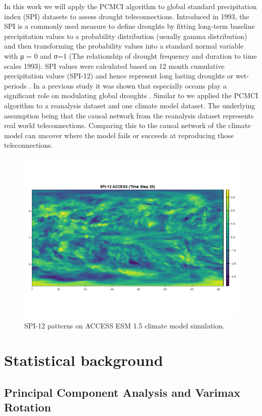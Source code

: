 \documentclass[
]{krantz}
\begin{document}
In this work we will apply the PCMCI algorithm to global standard precipitation index (SPI) datasets to assess drought teleconnections. Introduced in 1993, the SPI is a commonly used measure to define droughts by fitting long-term baseline precipitation values to a probability distribution (usually gamma distribution) and then transforming the probability values into a standard normal variable with μ = 0 and σ=1 (The relationship of drought frequency and duration to time scales 1993). SPI values were calculated based on 12 month cumulative precipitation values (SPI-12) and hence represent long lasting droughts or wet-periods \citep{chauhan2024}. In a previous study it was shown that especially oceans play a significant role on modulating global droughts \citep{chauhan2024}. Similar to \citep{nowack2020} we applied the PCMCI algorithm to a reanalysis dataset and one climate model dataset. The underlying assumption being that the causal network from the reanalysis dataset represents real world teleconnections. Comparing this to the causal network of the climate model can uncover where the model fails or succeeds at reproducing those teleconnections.

\begin{figure}

{\centering \includegraphics[width=0.49\linewidth]{work/02-causaldisc/figures/ACCESS/spi_access_plot} 

}

\caption{SPI-12 patterns on ACCESS ESM 1.5 climate model simulation.}\label{fig:figure10}
\end{figure}

\section{Statistical background}\label{statistical-background}

\subsection{Principal Component Analysis and Varimax Rotation}\label{principal-component-analysis-and-varimax-rotation}
\end{document}
